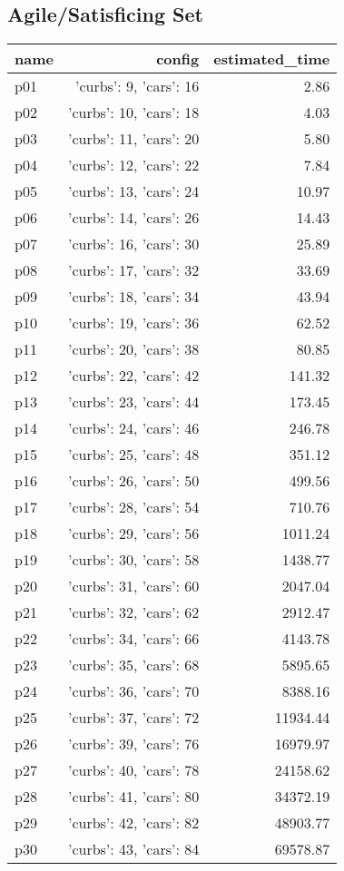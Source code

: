 \documentclass{article}
\begin{document}
                                \subsection*{Agile/Satisficing Set}
                                
                            \begin{center}
                            \scriptsize
                            \begin{tabular}{@{}l|r|r@{}}
                            name & config & estimated\_time\\\midrule
                              p01&{'curbs': 9, 'cars': 16}&2.86\\
  p02&{'curbs': 10, 'cars': 18}&4.03\\
  p03&{'curbs': 11, 'cars': 20}&5.80\\
  p04&{'curbs': 12, 'cars': 22}&7.84\\
  p05&{'curbs': 13, 'cars': 24}&10.97\\
  p06&{'curbs': 14, 'cars': 26}&14.43\\
  p07&{'curbs': 16, 'cars': 30}&25.89\\
  p08&{'curbs': 17, 'cars': 32}&33.69\\
  p09&{'curbs': 18, 'cars': 34}&43.94\\
  p10&{'curbs': 19, 'cars': 36}&62.52\\
  p11&{'curbs': 20, 'cars': 38}&80.85\\
  p12&{'curbs': 22, 'cars': 42}&141.32\\
  p13&{'curbs': 23, 'cars': 44}&173.45\\
  p14&{'curbs': 24, 'cars': 46}&246.78\\
  p15&{'curbs': 25, 'cars': 48}&351.12\\
  p16&{'curbs': 26, 'cars': 50}&499.56\\
  p17&{'curbs': 28, 'cars': 54}&710.76\\
  p18&{'curbs': 29, 'cars': 56}&1011.24\\
  p19&{'curbs': 30, 'cars': 58}&1438.77\\
  p20&{'curbs': 31, 'cars': 60}&2047.04\\
  p21&{'curbs': 32, 'cars': 62}&2912.47\\
  p22&{'curbs': 34, 'cars': 66}&4143.78\\
  p23&{'curbs': 35, 'cars': 68}&5895.65\\
  p24&{'curbs': 36, 'cars': 70}&8388.16\\
  p25&{'curbs': 37, 'cars': 72}&11934.44\\
  p26&{'curbs': 39, 'cars': 76}&16979.97\\
  p27&{'curbs': 40, 'cars': 78}&24158.62\\
  p28&{'curbs': 41, 'cars': 80}&34372.19\\
  p29&{'curbs': 42, 'cars': 82}&48903.77\\
  p30&{'curbs': 43, 'cars': 84}&69578.87
                            \end{tabular}
                            \end{center}
                    
\end{document}
